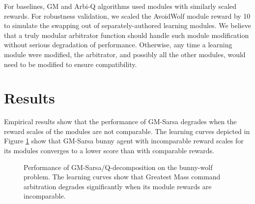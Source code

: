 For baselines, GM and Arbi-Q algorithms used modules with similarly scaled rewards. For robustness validation, we scaled the AvoidWolf module reward by 10 to simulate the swapping out of separately-authored learning modules.  We believe that a truly modular arbitrator function should handle such module modification without serious degradation of performance.  Otherwise, any time a learning module were modified, the arbitrator, and possibly all the other modules, would need to be modified to ensure compatibility.

\section{Results}

Empirical results show that the performance of GM-Sarsa degrades when the reward scales of the modules are not comparable. The learning curves depicted in Figure \ref{fig:gmsarsa-results} show that GM-Sarsa bunny agent with incomparable reward scales for its modules converges to a lower score than with comparable rewards.

\begin{figure}[ht]
  \begin{center}
    \caption{Performance of GM-Sarsa/Q-decomposition on the bunny-wolf problem. The learning curves show that Greatest Mass command arbitration degrades significantly when its module rewards are incomparable.}
  \end{center}
  \label{fig:gmsarsa-results}
\end{figure}

